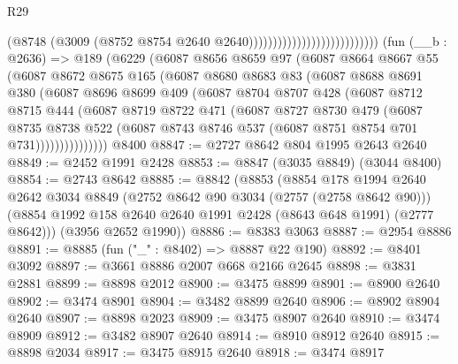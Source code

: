 \begin{lexlean}{R29}
\begin{coremodule}
                                                    (@8748
                                                      (@3009
                                                        (@8752
                                                          @8754
                                                          @2640
                                                          @2640)))))))))))))))))))))))))))
    (fun (__b : @2636) =>
    @189
      (@6229
        (@6087
          @8656
          @8659
          @97
          (@6087
            @8664
            @8667
            @55
            (@6087
              @8672
              @8675
              @165
              (@6087
                @8680
                @8683
                @83
                (@6087
                  @8688
                  @8691
                  @380
                  (@6087
                    @8696
                    @8699
                    @409
                    (@6087
                      @8704
                      @8707
                      @428
                      (@6087
                        @8712
                        @8715
                        @444
                        (@6087
                          @8719
                          @8722
                          @471
                          (@6087
                            @8727
                            @8730
                            @479
                            (@6087
                              @8735
                              @8738
                              @522
                              (@6087 @8743 @8746 @537 (@6087 @8751 @8754 @701 @731)))))))))))))))
    @8400
@8847 := @2727 @8642 @804 @1995 @2643 @2640
@8849 := @2452 @1991 @2428
@8853 := @8847 (@3035 @8849) (@3044 @8400)
@8854 := @2743 @8642
@8885 := @8842
    (@8853
      (@8854
        @178
        @1994
        @2640
        @2642
        @3034
        @8849
        (@2752 @8642 @90 @3034 (@2757 (@2758 @8642 @90)))
        (@8854 @1992 @158 @2640 @2640 @1991 @2428 (@8643 @648 @1991) (@2777 @8642)))
      (@3956 @2652 @1990))
@8886 := @8383 @3063
@8887 := @2954 @8886
@8891 := @8885 (fun ("_" : @8402) => @8887 @22 @190)
@8892 := @8401 @3092
@8897 := @3661 @8886 @2007 @668 @2166 @2645
@8898 := @3831 @2881
@8899 := @8898 @2012
@8900 := @3475 @8899
@8901 := @8900 @2640
@8902 := @3474 @8901
@8904 := @3482 @8899 @2640
@8906 := @8902 @8904 @2640
@8907 := @8898 @2023
@8909 := @3475 @8907 @2640
@8910 := @3474 @8909
@8912 := @3482 @8907 @2640
@8914 := @8910 @8912 @2640
@8915 := @8898 @2034
@8917 := @3475 @8915 @2640
@8918 := @3474 @8917

\end{coremodule}
\end{lexlean}

